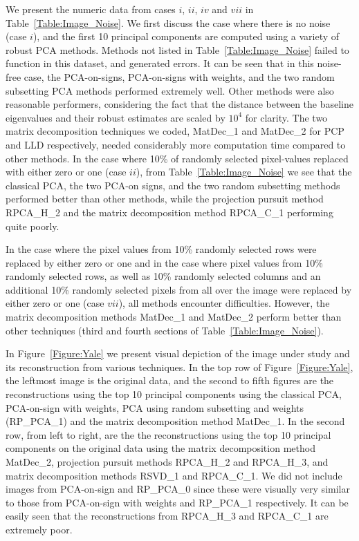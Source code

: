 \documentclass[ss]{imsart}
\theoremstyle{Example}
\begin{document}
We present the numeric data from cases $i$, $ii$, $iv$ and $vii$ in Table~\ref{Table:Image_Noise}. We first discuss the case where there is no noise (case $i$), and the first 10 principal components are computed using a variety of robust PCA methods. Methods not listed in Table~\ref{Table:Image_Noise} failed to function in this dataset, and generated errors. It can be seen that in this noise-free case, the PCA-on-signs, PCA-on-signs with weights, and the two random subsetting PCA methods performed extremely well. Other methods were also reasonable performers, considering the fact that the distance between the baseline eigenvalues and their robust estimates are scaled by $10^{4}$ for clarity. The two matrix decomposition techniques we coded, MatDec\_1 and MatDec\_2  for PCP and LLD respectively, needed considerably more computation time compared to other methods. In the case where 10\% of randomly selected pixel-values replaced with either  zero or one  (case $ii$), from Table~\ref{Table:Image_Noise} we see that the classical PCA, the two PCA-on signs, and the two random subsetting methods performed better than other methods, while the projection pursuit method RPCA\_H\_2 and the matrix decomposition method RPCA\_C\_1 performing quite poorly. 

In the case  where the pixel values from 10\% randomly selected rows were replaced by either zero or one and in the case where pixel values from 10\% randomly selected rows, as well as 10\% randomly selected columns and an additional 10\% randomly selected pixels from all over the image were replaced by either zero or one  (case $vii$), all methods encounter difficulties. However, the matrix decomposition methods MatDec\_1 and MatDec\_2 perform better than other techniques (third and fourth sections of Table~\ref{Table:Image_Noise}). 

In Figure~\ref{Figure:Yale} we present visual depiction of the image under study and its reconstruction from various techniques. In the top row of Figure~\ref{Figure:Yale}, the leftmost image is the original data, and the second to fifth figures are the reconstructions using the top 10 principal components using the classical PCA, PCA-on-sign with weights, PCA using random subsetting and weights (RP\_PCA\_1) and the matrix decomposition method MatDec\_1. In the second row, from left to right, are the the reconstructions using the top 10 principal components on the original data using the matrix decomposition method MatDec\_2, projection pursuit methods RPCA\_H\_2 and RPCA\_H\_3, and matrix decomposition methods  RSVD\_1 and RPCA\_C\_1. We did not include images from PCA-on-sign and RP\_PCA\_0 since these were visually very similar to those from PCA-on-sign with weights and  RP\_PCA\_1 respectively. It can be easily seen that the reconstructions from RPCA\_H\_3 and RPCA\_C\_1 are extremely poor. 
\end{document}
